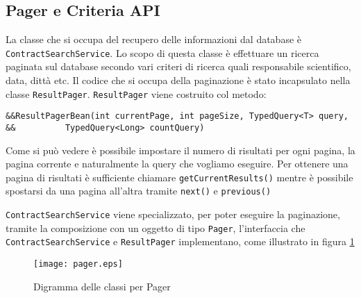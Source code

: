 \subsection{Pager e Criteria API}

La classe che si occupa del recupero delle informazioni dal database è \texttt{ContractSearchService}. Lo scopo di questa classe è effettuare un ricerca paginata sul database secondo vari criteri di ricerca quali 
responsabile scientifico, data, dittà etc. Il codice che si occupa della paginazione è stato incapsulato nella classe \texttt{ResultPager}. \texttt{ResultPager} viene costruito
col metodo:

\begin{lstlisting}
&&ResultPagerBean(int currentPage, int pageSize, TypedQuery<T> query,
&&			TypedQuery<Long> countQuery) 
\end{lstlisting}

Come si può vedere è possibile impostare il numero di risultati per ogni pagina, la pagina corrente e naturalmente la query che vogliamo eseguire. Per ottenere una pagina di risultati è sufficiente chiamare \lstinline{getCurrentResults()}
mentre è possibile spostarsi da una pagina all'altra tramite \lstinline{next()} e \lstinline{previous()}

\texttt{ContractSearchService} viene specializzato, per poter eseguire la paginazione, tramite la composizione con un oggetto di tipo \texttt{Pager}, l'interfaccia che \texttt{ContractSearchService} e \texttt{ResultPager} implementano, come
illustrato in figura \ref{pager}


\begin{figure}[h]
  \caption{Digramma delle classi per Pager}
  \label{pager}
  \centering
    \texttt{[image: pager.eps]}
\end{figure}

